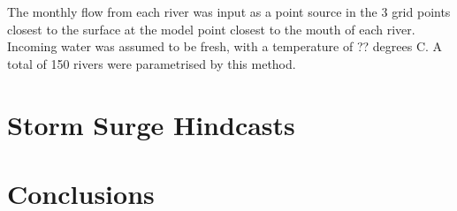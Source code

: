 \documentclass[pdftex,12pt]{article}
\begin{document}
The monthly flow from each river was input as a point source in the 3 grid points closest to the surface at the model point closest to the mouth of each river. Incoming water was assumed to be fresh, with a temperature of ?? degrees C. A total of 150 rivers were parametrised by this method. 

\section{Storm Surge Hindcasts}\label{sec:storm}

\section{Conclusions}\label{sec:conclusions}




\end{document}
